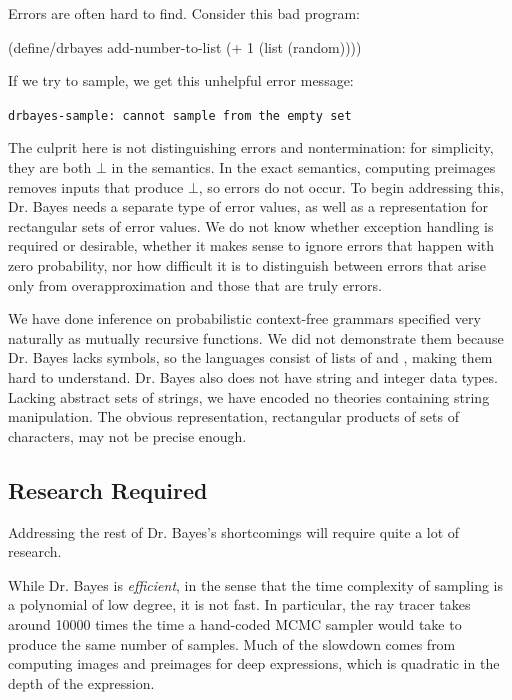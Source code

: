 Errors are often hard to find.
Consider this bad program:
\begin{center}\singlespacing
\begin{schemedisplay}
(define/drbayes add-number-to-list
  (+ 1 (list (random))))
\end{schemedisplay}
\end{center}
If we try to sample, we get this unhelpful error message:
\begin{center}\singlespacing
\texttt{drbayes-sample: cannot sample from the empty set}
\end{center}
The culprit here is not distinguishing errors and nontermination: for simplicity, they are both $\bot$ in the semantics.
In the exact semantics, computing preimages removes inputs that produce $\bot$, so errors do not occur.
To begin addressing this, Dr. Bayes needs a separate type of error values, as well as a representation for rectangular sets of error values.
We do not know whether exception handling is required or desirable, whether it makes sense to ignore errors that happen with zero probability, nor how difficult it is to distinguish between errors that arise only from overapproximation and those that are truly errors.

We have done inference on probabilistic context-free grammars specified very naturally as mutually recursive functions.
We did not demonstrate them because Dr. Bayes lacks symbols, so the languages consist of lists of  and , making them hard to understand.
Dr. Bayes also does not have string and integer data types.
Lacking abstract sets of strings, we have encoded no theories containing string manipulation.
The obvious representation, rectangular products of sets of characters, may not be precise enough.

\subsection{Research Required}

Addressing the rest of Dr. Bayes's shortcomings will require quite a lot of research.

While Dr. Bayes is \emph{efficient}, in the sense that the time complexity of sampling is a polynomial of low degree, it is not fast.
In particular, the ray tracer takes around 10000 times the time a hand-coded MCMC sampler would take to produce the same number of samples.
Much of the slowdown comes from computing images and preimages for deep  expressions, which is quadratic in the depth of the expression.


